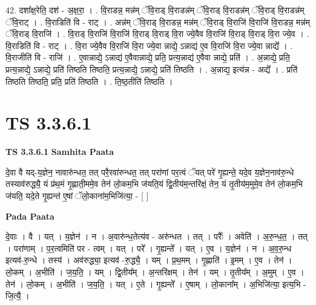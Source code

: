 \documentclass[17pt]{extarticle}
\begin{document}
42. दशा᳚क्ष॒रेति॒ दश॑ - अ॒क्ष॒रा॒ । . वि॒राडन्न॒ मन्न॑म् ॅवि॒राड् वि॒राडन्न॑म् ॅवि॒राड् वि॒राडन्न॑म् ॅवि॒राड् वि॒राडन्न॑म् ॅवि॒राट् । . वि॒राडिति॑ वि - राट् । . अन्न॑म् ॅवि॒राड् वि॒राडन्न॒ मन्न॑म् ॅवि॒राड् वि॒राजि॑ वि॒राजि॑ वि॒राडन्न॒ मन्न॑म् ॅवि॒राड् वि॒राजि॑ । . वि॒राड् वि॒राजि॑ वि॒राजि॑ वि॒राड् वि॒राड् वि॒रा ज्ये॒वैव वि॒राजि॑ वि॒राड् वि॒राड् वि॒रा ज्ये॒व । . वि॒राडिति॑ वि - राट् । . वि॒रा ज्ये॒वैव वि॒राजि॑ वि॒रा ज्ये॒वा न्नाद्ये॒ ऽन्नाद्य॑ ए॒व वि॒राजि॑ वि॒रा ज्ये॒वा न्नाद्ये᳚ । . वि॒राजीति॑ वि - राजि॑ । . ए॒वान्नाद्ये॒ ऽन्नाद्य॑ ए॒वैवान्नाद्ये॒ प्रति॒ प्रत्य॒न्नाद्य॑ ए॒वैवा न्नाद्ये॒ प्रति॑ । . अ॒न्नाद्ये॒ प्रति॒ प्रत्य॒न्नाद्ये॒ ऽन्नाद्ये॒ प्रति॑ तिष्ठति तिष्ठति॒ प्रत्य॒न्नाद्ये॒ ऽन्नाद्ये॒ प्रति॑ तिष्ठति । . अ॒न्नाद्य॒ इत्य॑न्न - अद्ये᳚ । . प्रति॑ तिष्ठति तिष्ठति॒ प्रति॒ प्रति॑ तिष्ठति । . ति॒ष्ठ॒तीति॑ तिष्ठति । \newline
\pagebreak
{}

\section{ TS 3.3.6.1 }

\textbf{TS 3.3.6.1 } \newline
\textbf{Samhita Paata} \newline

दे॒वा वै यद्-य॒ज्ञेन॒ नावारु॑न्धत॒ तत् परै॒रवा॑रुन्धत॒ तत् परा॑णां पर॒त्वं ॅयत् परे॑ गृ॒ह्यन्ते॒ यदे॒व य॒ज्ञेन॒नाव॑रु॒न्धे तस्याव॑रुद्ध्यै॒ यं प्र॑थ॒मं गृ॒ह्णाती॒ममे॒व तेन॑ लो॒कम॒भि ज॑यति॒यं द्वि॒तीय॑म॒न्तरि॑क्षं॒ तेन॒ यं तृ॒तीय॑म॒मुमे॒व तेन॑ लो॒कम॒भि ज॑यति॒ यदे॒ते गृ॒ह्यन्त॑ ए॒षां ॅलो॒काना॑म॒भिजि॑त्या॒ - [  ] \newline

\textbf{Pada Paata} \newline

दे॒वाः । वै । यत् । य॒ज्ञेन॑ । न । अ॒वारु॑न्ध॒तेत्य॑व - अरु॑न्धत । तत् । परैः᳚ । अवेति॑ । अ॒रु॒न्ध॒त॒ । तत् । परा॑णाम् । प॒र॒त्वमिति॑ पर - त्वम् । यत् । परे᳚ । गृ॒ह्यन्ते᳚ । यत् । ए॒व । य॒ज्ञेन॑ । न । अ॒व॒रु॒न्ध इत्यव॑-रु॒न्धे । तस्य॑ । अव॑रुद्ध्या॒ इत्यव॑ -रु॒द्ध्यै॒ । यम् । प्र॒थ॒मम् । गृ॒ह्णाति॑ । इ॒मम् । ए॒व । तेन॑ । लो॒कम् । अ॒भीति॑ । ज॒य॒ति॒ । यम् । द्वि॒तीय᳚म् । अ॒न्तरि॑क्षम् । तेन॑ । यम् । तृ॒तीय᳚म् । अ॒मुम् । ए॒व । तेन॑ । लो॒कम् । अ॒भीति॑ । ज॒य॒ति॒ । यत् । ए॒ते । गृ॒ह्यन्ते᳚ । ए॒षाम् । लो॒काना᳚म् । अ॒भिजि॑त्या॒ इत्य॒भि - जि॒त्यै॒ ।  \newline
\end{document}
